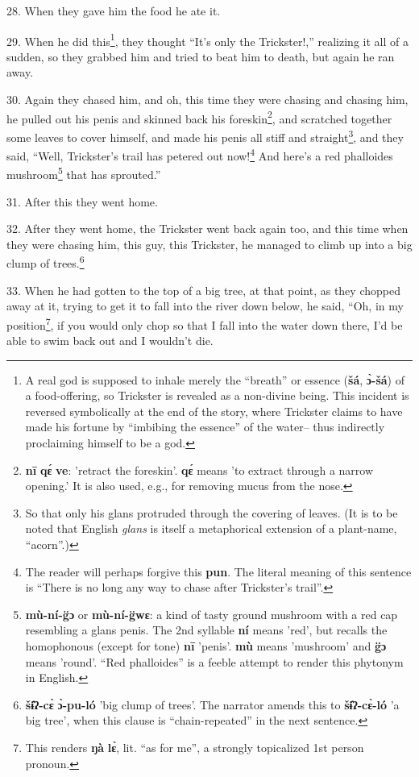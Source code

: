 28. When they gave him the food he ate it.

29. When he did this\footnote{A real god is supposed to inhale merely the ``breath'' or essence (\textbf{šá}, \textbf{ɔ̀-šá}) of a food-offering, so Trickster is revealed as a non-divine being. This incident is reversed symbolically at the end of the story, where Trickster claims to have made his fortune by ``imbibing the essence'' of the water-- thus indirectly proclaiming himself to be a god.}, they thought ``It's only the Trickster!,'' realizing
it all of a sudden, so they grabbed him and tried to beat him to death, but again
he ran away.

30. Again they chased him, and oh, this time they were chasing and chasing him,
he pulled out his penis and skinned back his foreskin\footnote{\textbf{nī} \textbf{qɛ́} \textbf{ve}: 'retract the foreskin'. \textbf{qɛ́} means 'to extract through a narrow opening.' It is also used, e.g., for removing mucus from the nose.}, and scratched together
some leaves to cover himself, and made his penis all stiff and straight\footnote{So that only his glans protruded through the covering of leaves. (It is to be noted that English \textit{glans} is itself a metaphorical extension of a plant-name, ``acorn''.)}, and
they said, ``Well, Trickster's trail has petered out now!\footnote{The reader will perhaps forgive this \textbf{pun}. The literal meaning of this sentence is ``There is no long any way to chase after Trickster's trail''.} And here's a red
phalloides mushroom\footnote{\textbf{mù-ní-g̈ɔ} or \textbf{mù-ní-g̈wɛ}: a kind of tasty ground mushroom with a red cap resembling a glans penis. The 2nd syllable \textbf{ní} means 'red', but recalls the homophonous (except for tone) \textbf{nī} 'penis'. \textbf{mù} means 'mushroom' and \textbf{g̈ɔ} means 'round'. ``Red phalloides'' is a feeble attempt to render this phytonym in English.} that has sprouted.''

31. After this they went home.

32. After they went home, the Trickster went back again too, and this time when
they were chasing him, this guy, this Trickster, he managed to climb up into a
big clump of trees.\footnote{\textbf{šɨ̂ʔ-cɛ̀} \textbf{ɔ̀-pu-ló} 'big clump of trees'. The narrator amends this to \textbf{šɨ̂ʔ-cɛ̀-ló} 'a big tree', when this clause is ``chain-repeated'' in the next sentence.}

33. When he had gotten to the top of a big tree, at that point, as they chopped
away at it, trying to get it to fall into the river down below, he said, ``Oh,
in my position\footnote{This renders \textbf{ŋà} \textbf{lɛ̀}, lit. ``as for me'', a strongly topicalized 1st person pronoun.}, if you would only chop so that I fall into the water down
there, I'd be able to swim back out and I wouldn't die.

